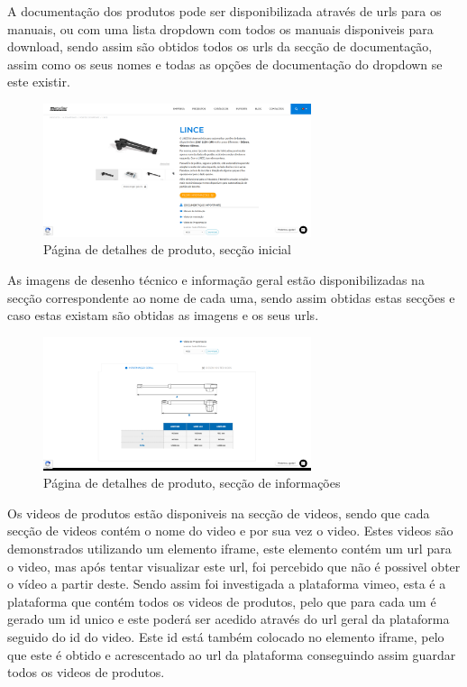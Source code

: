 A documentação dos produtos pode ser disponibilizada através de urls para os manuais,
ou com uma lista dropdown com todos os manuais disponiveis para download, sendo assim são obtidos todos os urls da secção de documentação, 
assim como os seus nomes e todas as opções de documentação do dropdown se este existir.

\begin{figure}[htb]
    \centering
    
    \includegraphics[width=0.7\textwidth]{images/implementacao/scraper/pagina_detalhes_produto.png}
    \caption{Página de detalhes de produto, secção inicial}
    \label{fig:53}
\end{figure}

\newpage

As imagens de desenho técnico e informação geral estão disponibilizadas na secção correspondente
ao nome de cada uma, sendo assim obtidas estas secções e caso estas existam são obtidas as imagens e os seus urls.

\begin{figure}[htb]
    \centering
    
    \includegraphics[width=0.7\textwidth]{images/implementacao/scraper/pagina_detalhes_desenhos.png}
    \caption{Página de detalhes de produto, secção de informações}
    \label{fig:54}
\end{figure}

Os videos de produtos estão disponiveis na secção de videos, sendo que cada secção de videos contém o nome do video e por sua vez o video.
Estes videos são demonstrados utilizando um elemento iframe, este elemento contém um url para o video, mas após tentar visualizar este url,
foi percebido que não é possivel obter o vídeo a partir deste. Sendo assim foi investigada a plataforma vimeo, esta é a plataforma que contém
todos os videos de produtos, pelo que para cada um é gerado um id unico e este poderá ser acedido através do url geral da plataforma seguido 
do id do video. Este id está também colocado no elemento iframe, pelo que este é obtido e acrescentado ao url da plataforma conseguindo assim
guardar todos os videos de produtos.

